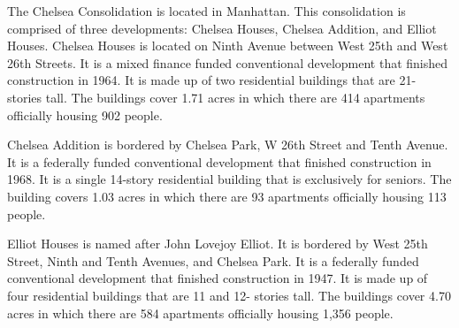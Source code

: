      

   

The Chelsea Consolidation is located in Manhattan. This consolidation is comprised of three developments: Chelsea Houses, Chelsea Addition, and Elliot Houses. Chelsea Houses is located on Ninth Avenue between West 25th and West 26th Streets. It is a mixed finance funded conventional development that finished construction in 1964. It is made up of two residential buildings that are 21- stories tall. The buildings cover 1.71 acres in which there are 414 apartments officially housing 902 people. 

Chelsea Addition is bordered by Chelsea Park, W 26th Street and Tenth Avenue. It is a federally funded conventional development that finished construction in 1968. It is a single 14-story residential building that is exclusively for seniors. The building covers 1.03 acres in which there are 93 apartments officially housing 113 people. 

Elliot Houses is named after John Lovejoy Elliot. It is bordered by West 25th Street, Ninth and Tenth Avenues, and Chelsea Park. It is a federally funded conventional development that finished construction in 1947. It is made up of four residential buildings that are 11 and 12- stories tall. The buildings cover 4.70 acres in which there are 584 apartments officially housing 1,356 people. 